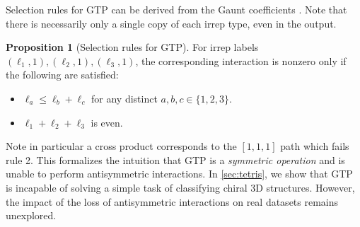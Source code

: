 \documentclass{article}
\theoremstyle{definition}
\newtheorem{proposition}[theorem]{Proposition}
\theoremstyle{remark}
\begin{document}

Selection rules for GTP can be derived from the Gaunt coefficients \citep{gaunt1929iv}. Note that there is necessarily only a single copy of each irrep type, even in the output. 

\begin{proposition}[Selection rules for GTP]
    For irrep labels $(\ell_1, 1), (\ell_2, 1), (\ell_3, 1)$, the corresponding interaction is nonzero only if the following are satisfied:
    \begin{itemize}
        \item $\ell_a \leq \ell_b + \ell_c$ for any distinct $a,b,c \in \{1, 2, 3\}$.
        \item $\ell_1+\ell_2+\ell_3$ is even.
        \label{rule:GTP_antisymm}
    \end{itemize}
    \label{thm:GTP_selection}
\end{proposition}

Note in particular a cross product corresponds to the $[1,1,1]$ path which fails rule 2. This formalizes the intuition that GTP is a \emph{symmetric operation} and is unable to perform antisymmetric interactions. In \autoref{sec:tetris}, we show that GTP is incapable of solving a simple task of classifying chiral 3D structures. However, the impact of the loss of antisymmetric interactions on real datasets remains unexplored.


\end{document}
